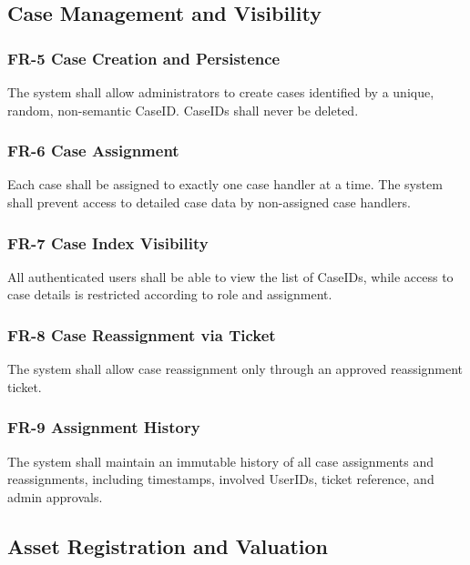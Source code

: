 \documentclass[12pt,a4paper]{report}
\begin{document}
\subsection{Case Management and Visibility}


\subsubsection{FR-5 Case Creation and Persistence}

The system shall allow administrators to create cases identified by a unique, random, non-semantic CaseID. CaseIDs shall never be deleted.

\subsubsection{FR-6 Case Assignment}

Each case shall be assigned to exactly one case handler at a time. The system shall prevent access to detailed case data by non-assigned case handlers.

\subsubsection{FR-7 Case Index Visibility}

All authenticated users shall be able to view the list of CaseIDs, while access to case details is restricted according to role and assignment.

\subsubsection{FR-8 Case Reassignment via Ticket}

The system shall allow case reassignment only through an approved reassignment ticket.


\subsubsection{FR-9 Assignment History}

The system shall maintain an immutable history of all case assignments and reassignments, including timestamps, involved UserIDs, ticket reference, and admin approvals.

\subsection{Asset Registration and Valuation}
\end{document}
